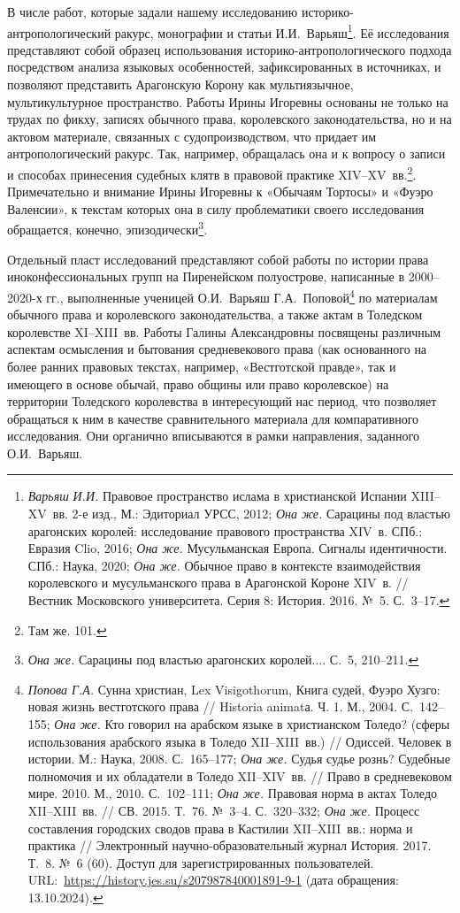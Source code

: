 В числе работ, которые задали нашему исследованию историко-антропологический ракурс, монографии и статьи И.И.~Варьяш\footnote{\emph{Варьяш}\emph{ И.И.} Правовое пространство ислама в христианской Испании XIII--XV~вв. 2-е изд., М.: Эдиториал УРСС, 2012; \emph{Она же.} Сарацины под властью арагонских королей: исследование правового пространства XIV~в. СПб.: Евразия Clio, 2016; \emph{Она же.} Мусульманская Европа. Сигналы идентичности. СПб.: Наука, 2020; \emph{Она же.} Обычное право в контексте взаимодействия королевского и мусульманского права в Арагонской Короне XIV~в. // Вестник Московского университета. Серия 8: История. 2016. №~5. С.~3--17.}. Её исследования представляют собой образец использования историко-антропологического подхода посредством анализа языковых особенностей, зафиксированных в источниках, и позволяют представить Арагонскую Корону как мультиязычное, мультикультурное пространство. Работы Ирины Игоревны основаны не только на трудах по фикху, записях обычного права, королевского законодательства, но и на актовом материале, связанных с судопроизводством, что придает им антропологический ракурс. Так, например, обращалась она и к вопросу о записи и способах принесения судебных клятв в правовой практике XIV--XV~вв.\footnote{Там же. 101.}. Примечательно и внимание Ирины Игоревны к «Обычаям Тортосы» и «Фуэро Валенсии», к текстам которых она в силу проблематики своего исследования обращается, конечно, эпизодически\footnote{\emph{Она же.} Сарацины под властью арагонских королей.... С.~5, 210--211.}.

Отдельный пласт исследований представляют собой работы по истории права иноконфессиональных групп на Пиренейском полуострове, написанные в 2000--2020-х гг., выполненные ученицей О.И.~Варьяш Г.А.~Поповой\footnote{\emph{Попова Г.А.} Сунна христиан, Lex Visigothorum, Книга судей, Фуэро Хузго: новая жизнь вестготского права // Historia animatа. Ч. 1. М., 2004. С.~142--155; \emph{Она же.} Кто говорил на арабском языке в христианском Толедо? (сферы использования арабского языка в Толедо XII--XIII~вв.) // Одиссей. Человек в истории. М.: Наука, 2008. С.~165--177; \emph{Она же.} Судья судье рознь? Судебные полномочия и их обладатели в Толедо XII--XIV~вв. // Право в средневековом мире. 2010. М., 2010. С.~102--111; \emph{Она же.} Правовая норма в актах Толедо XII--XIII~вв. // СВ. 2015. Т.~76. №~3--4. С.~320--332; \emph{Она же.} Процесс составления городских сводов права в Кастилии XII--XIII~вв.: норма и практика // Электронный научно-образовательный журнал История. 2017. Т.~8. №~6 (60). Доступ для зарегистрированных пользователей. URL:~\url{https://history.jes.su/s207987840001891-9-1} (дата обращения: 13.10.2024).} по материалам обычного права и королевского законодательства, а также актам в Толедском королевстве XI--XIII~вв. Работы Галины Александровны посвящены различным аспектам осмысления и бытования средневекового права (как основанного на более ранних правовых текстах, например, «Вестготской правде», так и имеющего в основе обычай, право общины или право королевское) на территории Толедского королевства в интересующий нас период, что позволяет обращаться к ним в качестве сравнительного материала для компаративного исследования. Они органично вписываются в рамки направления, заданного О.И.~Варьяш.

